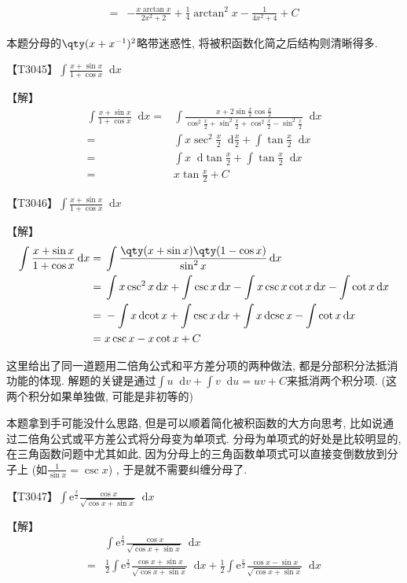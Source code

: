 \documentclass{ctexbook}
\newcommand{\e}{\mathrm{e}}
\newcommand*{\dif}{\mathop{}\!\mathrm{d}}
\begin{document}
{\begin{align*}
={}&-\frac{x\arctan{x}}{2x^{2}+2}+\frac{1}{4}\arctan^{2}{x}-\frac{1}{4x^{2}+4}+C
\end{align*}\par
{\kaishu 本题分母的$\qty(x+x^{-1})^{2}$略带迷惑性, 将被积函数化简之后结构则清晰得多. \par}
【T3045】$\int\frac{x+\sin{x}}{1+\cos{x}}\dif{x}$\par
【解】
\begin{align*}
\int\frac{x+\sin{x}}{1+\cos{x}}\dif{x}={}&\int\frac{x+2\sin{\frac{x}{2}}\cos{\frac{x}{2}}}{\cos^{2}{\frac{x}{2}}+\sin^{2}{\frac{x}{2}}+\cos^{2}{\frac{x}{2}}-\sin^{2}{\frac{x}{2}}}\dif{x}\\
={}&\int x\sec^{2}{\frac{x}{2}}\dif{\frac{x}{2}}+\int\tan{\frac{x}{2}}\dif{x}\\
={}&\int x\dif{\tan{\frac{x}{2}}}+\int\tan{\frac{x}{2}}\dif{x}\\
={}&x\tan{\frac{x}{2}}+C
\end{align*}\par
【T3046】$\int\frac{x+\sin{x}}{1+\cos{x}}\dif{x}$\par
【解】
\begin{align*}
\int\frac{x+\sin{x}}{1+\cos{x}}\dif{x}={}&\int\frac{\qty(x+\sin{x})\qty(1-\cos{x})}{\sin^{2}{x}}\dif{x}\\
={}&\int x\csc^{2}{x}\dif{x}+\int\csc{x}\dif{x}-\int x\csc{x}\cot{x}\dif{x}-\int\cot{x}\dif{x}\\
={}&-\int x\dif{\cot{x}}+\int\csc{x}\dif{x}+\int x\dif{\csc{x}}-\int\cot{x}\dif{x}\\
={}&x\csc{x}-x\cot{x}+C
\end{align*}\par
{\kaishu 这里给出了同一道题用二倍角公式和平方差分项的两种做法, 都是分部积分法抵消功能的体现. 解题的关键是通过$\int u\dif{v}+\int v\dif{u}=uv+C$来抵消两个积分项.  (这两个积分如果单独做, 可能是非初等的) \par
本题拿到手可能没什么思路, 但是可以顺着简化被积函数的大方向思考, 比如说通过二倍角公式或平方差公式将分母变为单项式. 分母为单项式的好处是比较明显的, 在三角函数问题中尤其如此, 因为分母上的三角函数单项式可以直接变倒数放到分子上 (如$\frac{1}{\sin{x}}=\csc{x}$) , 于是就不需要纠缠分母了. \par}
【T3047】$\int\e^{\frac{x}{2}}\frac{\cos{x}}{\sqrt{\cos{x}+\sin{x}}}\dif{x}$\par
【解】
\begin{align*}
{}&\int\e^{\frac{x}{2}}\frac{\cos{x}}{\sqrt{\cos{x}+\sin{x}}}\dif{x}\\
={}&\frac{1}{2}\int\e^{\frac{x}{2}}\frac{\cos{x}+\sin{x}}{\sqrt{\cos{x}+\sin{x}}}\dif{x}+\frac{1}{2}\int\e^{\frac{x}{2}}\frac{\cos{x}-\sin{x}}{\sqrt{\cos{x}+\sin{x}}}\dif{x}\\

\end{align*}}
\end{document}
